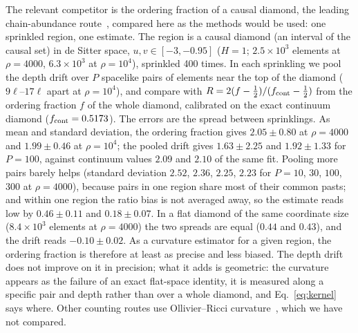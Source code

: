 \documentclass[prd,twocolumn,superscriptaddress,nofootinbib,amsmath,amssymb,floatfix]{revtex4-2}
\begin{document}
The relevant competitor is the ordering fraction of a causal diamond, the leading chain-abundance route~\cite{RSS13}, compared here as the methods would be used: one sprinkled region, one estimate. The region is a causal diamond (an interval of the causal set) in de Sitter space, $u,v\in[-3,-0.95]$ ($H=1$; $2.5\times10^3$ elements at $\rho=4000$, $6.3\times10^3$ at $\rho=10^4$), sprinkled 400 times. In each sprinkling we pool the depth drift over $P$ spacelike pairs of elements near the top of the diamond ($9\ell$--$17\ell$ apart at $\rho=10^4$), and compare with $R=2(f-\tfrac12)/(f_{\rm cont}-\tfrac12)$ from the ordering fraction $f$ of the whole diamond, calibrated on the exact continuum diamond ($f_{\rm cont}=0.5173$). The errors are the spread between sprinklings. As mean and standard deviation, the ordering fraction gives $2.05\pm0.80$ at $\rho=4000$ and $1.99\pm0.46$ at $\rho=10^4$; the pooled drift gives $1.63\pm2.25$ and $1.92\pm1.33$ for $P=100$, against continuum values $2.09$ and $2.10$ of the same fit. Pooling more pairs barely helps (standard deviation $2.52$, $2.36$, $2.25$, $2.23$ for $P=10$, $30$, $100$, $300$ at $\rho=4000$), because pairs in one region share most of their common pasts; and within one region the ratio bias is not averaged away, so the estimate reads low by $0.46\pm0.11$ and $0.18\pm0.07$. In a flat diamond of the same coordinate size ($8.4\times10^3$ elements at $\rho=4000$) the two spreads are equal ($0.44$ and $0.43$), and the drift reads $-0.10\pm0.02$. As a curvature estimator for a given region, the ordering fraction is therefore at least as precise and less biased. The depth drift does not improve on it in precision; what it adds is geometric: the curvature appears as the failure of an exact flat-space identity, it is measured along a specific pair and depth rather than over a whole diamond, and Eq.~\eqref{eq:kernel} says where. Other counting routes use Ollivier--Ricci curvature~\cite{BBR26}, which we have not compared.
\end{document}
